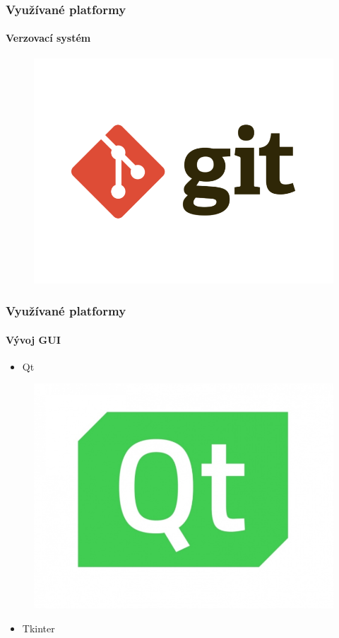 \documentclass{beamer}
\begin{document}
		\begin{frame}
		\frametitle{Využívané platformy}
		\framesubtitle{Verzovací systém}
		\begin{figure}[h]
		\centering
			\includegraphics[scale=0.5]{git.png}
		\end{figure}
	\end{frame}

	\begin{frame}
		\frametitle{Využívané platformy}
		\framesubtitle{Vývoj GUI}
		\begin{itemize}
			\item Qt
		\end{itemize}		
		\begin{figure}[h]
			\centering
		    \includegraphics[scale=0.2]{pyqt.jpg}
		\end{figure}		    
		\begin{itemize}
			\item Tkinter
		\end{itemize}
	\end{frame}				
			
\end{document}
